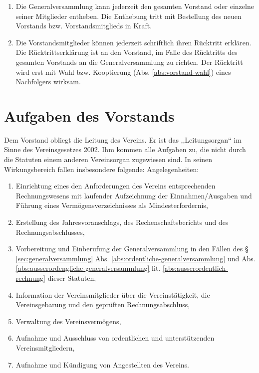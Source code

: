 \documentclass[a4paper,12pt]{article}
\begin{document}
\begin{enumerate}
			\label{abs:vorstand-ende}
			\item Die Generalversammlung kann jederzeit den gesamten Vorstand oder einzelne seiner Mitglieder entheben. Die Enthebung tritt mit Bestellung des neuen Vorstands bzw. Vorstandsmitglieds in Kraft.
			\label{abs:vorstand-enthebung}
			\item Die Vorstandsmitglieder können jederzeit schriftlich ihren Rücktritt erklären. Die Rücktrittserklärung ist an den Vorstand, im Falle des Rücktritts des gesamten Vorstands an die Generalversammlung zu richten. Der Rücktritt wird erst mit Wahl bzw. Kooptierung (Abs. \ref{abs:vorstand-wahl}) eines Nachfolgers wirksam.
			\label{abs:vorstand-ruecktritt}
		\end{enumerate}

	\section{Aufgaben des Vorstands}
		\label{sec:aufgaben-vorstand}
		Dem Vorstand obliegt die Leitung des Vereins. Er ist das ,,Leitungsorgan`` im Sinne des Vereinsgesetzes 2002. Ihm kommen alle Aufgaben zu, die nicht durch die Statuten einem anderen Vereinsorgan zugewiesen sind. In seinen Wirkungsbereich fallen insbesondere folgende:
		Angelegenheiten:
		\begin{enumerate}
			\item Einrichtung eines den Anforderungen des Vereins entsprechenden Rechnungswesens mit laufender Aufzeichnung der Einnahmen/Ausgaben und Führung eines Vermögensverzeichnisses als Mindesterfordernis,
			\item Erstellung des Jahresvoranschlags, des Rechenschaftsberichts und des Rechnungsabschlusses,
			\item Vorbereitung und Einberufung der Generalversammlung in den Fällen des § \ref{sec:generalversammlung} Abs. \ref{abs:ordentliche-generalversammlung} und Abs. \ref{abs:ausserordengliche-generalversammlung} lit. \ref{abs:ausserordentlich-rechnung} dieser Statuten,
			\item Information der Vereinsmitglieder über die Vereinstätigkeit, die Vereinsgebarung und den geprüften Rechnungsabschluss,
			\item Verwaltung des Vereinsvermögens,
			\item Aufnahme und Ausschluss von ordentlichen und unterstützenden Vereinsmitgliedern,
			\item Aufnahme und Kündigung von Angestellten des Vereins.
		\end{enumerate}
\end{document}
